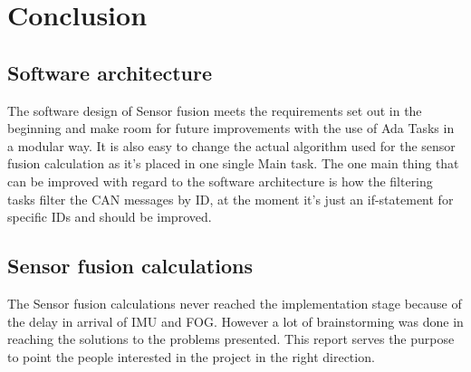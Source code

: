\section{Conclusion}\label{sec:conclusion}
\subsection{Software architecture}
The software design of Sensor fusion meets the requirements set out in the
beginning and make room for future improvements with the use of Ada Tasks
in a modular way. It is also easy to change the actual algorithm used for the
sensor fusion calculation as it's placed in one single Main task. The one main
thing that can be improved with regard to the software architecture is how
the filtering tasks filter the CAN messages by ID, at the moment it's just an
if-statement for specific IDs and should be improved.

\subsection{Sensor fusion calculations}
The Sensor fusion calculations never reached the implementation
stage because of the delay in arrival of IMU and FOG. However a lot
of brainstorming was done in reaching the solutions to the problems presented.
This report serves the purpose to point the people interested in the
project in the right direction.
